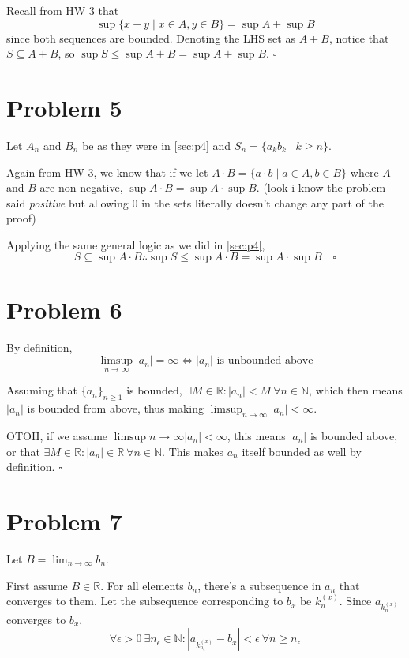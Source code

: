 \documentclass[12pt]{article}
\newcommand{\N}{\mathbb{N}}
\newcommand{\R}{\mathbb{R}}
\begin{document}
Recall from HW 3 that
\[\sup \{x+y \mid x \in A, y \in B\} = \sup A + \sup B\]
since both sequences are bounded.
Denoting the LHS set as $A+B$, notice that $S \subseteq A+B$,
so $\sup S \le \sup A+B = \sup A + \sup B$. $\square$

\section{Problem 5}

Let $A_n$ and $B_n$ be as they were in \ref{sec:p4} and $S_n=\{a_kb_k \mid k \ge n\}$.

Again from HW 3, we know that if we let $A \cdot B = \{a \cdot b \mid a \in A, b \in B\}$
where $A$ and $B$ are non-negative, $\sup A \cdot B = \sup A \cdot \sup B$.
(look i know the problem said \textit{positive} but allowing $0$ in the sets literally doesn't change any part of the proof)

Applying the same general logic as we did in \ref{sec:p4},
\[S \subseteq \sup A \cdot B \therefore \sup S \le \sup A \cdot B = \sup A \cdot \sup B\quad\square\]

\pagebreak

\section{Problem 6}

By definition,
\[\limsup_{n \to \infty} |a_n|=\infty \iff \text{$|a_n|$ is unbounded above}\]

Assuming that $\{a_n\}_{n \ge 1}$ is bounded, $\exists M \in \R: |a_n| < M\ \forall n \in \N$,
which then means $|a_n|$ is bounded from above, thus making $\limsup_{n \to \infty} |a_n| < \infty$.

OTOH, if we assume $\limsup{n \to \infty} |a_n| < \infty$, this means $|a_n|$ is bounded above,
or that $\exists M \in \R: |a_n| \in \R\ \forall n \in \N$.
This makes $a_n$ itself bounded as well by definition. $\square$

\section{Problem 7}

Let $B=\lim_{n \to \infty} b_n$.

First assume $B \in \R$.
For all elements $b_n$, there's a subsequence in $a_n$ that converges to them.
Let the subsequence corresponding to $b_x$ be $k^{(x)}_n$.
Since $a_{k^{(x)}_n}$ converges to $b_x$,
\[\forall \epsilon > 0\ \exists n_\epsilon \in \N: \left|a_{k^{(x)}_{n_\epsilon}}-b_x\right| < \epsilon\ \forall n \ge n_\epsilon\]
\end{document}
